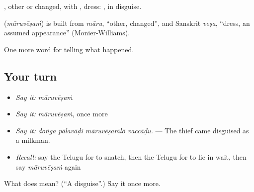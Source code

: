 , other or changed, with , dress: , in disguise.

\begin{cousinweb}
\textbf{} (\emph{māruvēṣaṁ}) is built from \emph{māru}, \textquotedblleft{}other, changed\textquotedblright{}, and Sanskrit \emph{veṣa}, \textquotedblleft{}dress, an assumed appearance\textquotedblright{} (Monier-Williams).
\end{cousinweb}

\begin{grammarlens}[title={What you've built}]
One more word for telling what happened.
\end{grammarlens}

\subsection*{Your turn}
\begin{itemize}
\raggedright
  \item \emph{Say it:} \emph{māruvēṣaṁ}
  \item \emph{Say it:} \emph{māruvēṣaṁ}, once more
  \item \emph{Say it:} \emph{doṅga pālavāḍi māruvēṣaṁlō vaccāḍu.} — The thief came disguised as a milkman.
  \item \emph{Recall:} say the Telugu for to snatch, then the Telugu for to lie in wait, then say \emph{māruvēṣaṁ} again
\end{itemize}

\begin{tcolorbox}[breakable,colback=teal!4,colframe=teal!35!black,title={Before you move on}]
What does  mean? (\textquotedblleft{}A disguise\textquotedblright{}.) Say it once more.
\end{tcolorbox}
